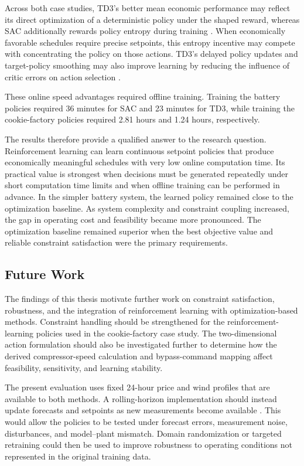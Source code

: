 \documentclass[12pt]{article}
\begin{document}
Across both case studies, TD3's better mean economic performance may reflect its direct optimization of a deterministic policy under the shaped reward, whereas SAC additionally rewards policy entropy during training \cite{haarnoja2018soft}. When economically favorable schedules require precise setpoints, this entropy incentive may compete with concentrating the policy on those actions. TD3's delayed policy updates and target-policy smoothing may also improve learning by reducing the influence of critic errors on action selection \cite{fujimoto2018addressing}.

These online speed advantages required offline training. Training the battery policies required 36 minutes for SAC and 23 minutes for TD3, while training the cookie-factory policies required 2.81 hours and 1.24 hours, respectively.

The results therefore provide a qualified answer to the research question. Reinforcement learning can learn continuous setpoint policies that produce economically meaningful schedules with very low online computation time. Its practical value is strongest when decisions must be generated repeatedly under short computation time limits and when offline training can be performed in advance. In the simpler battery system, the learned policy remained close to the optimization baseline. As system complexity and constraint coupling increased, the gap in operating cost and feasibility became more pronounced. The optimization baseline remained superior when the best objective value and reliable constraint satisfaction were the primary requirements.

\subsection{Future Work}

The findings of this thesis motivate further work on constraint satisfaction, robustness, and the integration of reinforcement learning with optimization-based methods. Constraint handling should be strengthened for the reinforcement-learning policies used in the cookie-factory case study. The two-dimensional action formulation should also be investigated further to determine how the derived compressor-speed calculation and bypass-command mapping affect feasibility, sensitivity, and learning stability.

The present evaluation uses fixed 24-hour price and wind profiles that are available to both methods. A rolling-horizon implementation should instead update forecasts and setpoints as new measurements become available \cite{kyriakidis2025energy}. This would allow the policies to be tested under forecast errors, measurement noise, disturbances, and model--plant mismatch. Domain randomization or targeted retraining could then be used to improve robustness to operating conditions not represented in the original training data.
\end{document}
